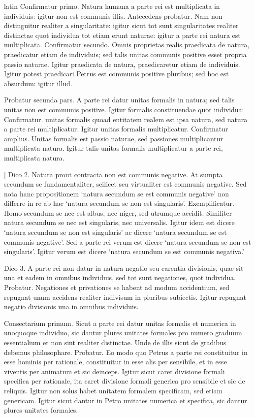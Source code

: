 \begin{otherlanguage*}{latin}
\pstart
Confirmatur primo. Natura humana a parte rei est multiplicata in individuis:
igitur non est communis illis. Antecedens probatur. Nam non distinguitur realiter a singularitate:
igitur sicut tot sunt singularitates realiter distinctae quot individua tot etiam erunt naturae:
igitur a parte rei natura est multiplicata. Confirmatur secundo. Omnis proprietas realis praedicata de natura, praedicatur etiam de individuis; sed talis unitas communis positive esset propria passio naturae. Igitur praedicata de natura, praedicaretur etiam de individuis. Igitur potest praedicari Petrus est communis positive pluribus; sed hoc est absurdum:
igitur illud. 
\pend

\pstart
Probatur secunda pars. A parte rei datur unitas formalis in natura; sed talis unitas non est communis positive. Igitur formalis constituendae quot individua:
Confirmatur. unitas formalis quoad entitatem realem est ipsa natura, sed natura a parte rei multiplicatur. Igitur unitas formalis multiplicatur. Confirmatur amplius. Unitas formalis est passio naturae, sed passiones multiplicantur multiplicata natura. Igitur talis unitas formalis multiplicatur a parte rei, multiplicata natura. 
\pend

\pstart
\textnormal{|} Dico 2. Natura prout contracta non est communis negative. At sumpta secundum se fundamentaliter, scilicet seu virtualiter est communis negative. Sed nota hanc propositionem `natura secundum se est communis negative' non differre in re ab hac `natura secundum se non est singularis'. Exemplificatur. Homo secundum se nec est albus, nec niger, sed utrumque accidit. Similiter natura secundum se nec est singularis, nec universalis. Igitur idem est dicere `natura secundum se non est singularis' ac dicere `natura secundum se est communis negative'. Sed a parte rei verum est dicere `natura secundum se non est singularis'. Igitur verum est dicere `natura secundum se est communis negativa.' 
\pend

\pstart
Dico 3. A parte rei non datur in natura negatio seu carentia divisionis, quae sit una et eadem in omnibus individuis, sed tot sunt negationes, quot individua. Probatur. Negationes et privationes se habent ad modum accidentium, sed repugnat unum accidens realiter indivisum in pluribus subiectis. Igitur repugnat negatio divisionis una in omnibus individuis. 
\pend

\pstart
Consectarium primum. Sicut a parte rei datur unitas formalis et numerica in unoquoque individuo, sic dantur plures unitates formales pro numero graduum essentialium et non sint realiter distinctae. Unde de illis sicut de gradibus debemus philosophare. Probatur. Eo modo quo Petrus a parte rei constituitur in esse hominis per rationale, constituitur in esse alis per sensibile, et in esse viventis per animatum et sic deinceps. Igitur sicut caret divisione formali specifica per rationale, ita caret divisione formali generica pro sensibile et sic de reliquis. Igitur non solus habet unitatem formalem specificam, sed etiam genericam. Igitur sicut dantur in Petro unitates numerica et specifica, sic dantur plures unitates formales. 
\pend


\end{otherlanguage*}
